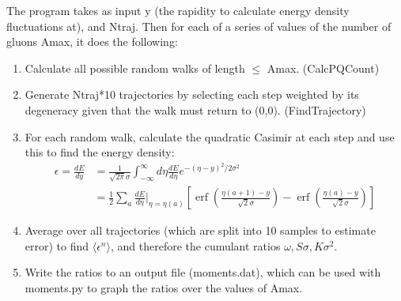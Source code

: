 \documentclass{article}
\DeclareMathOperator\erf{erf}
\begin{document}
The program takes as input y (the rapidity to calculate energy density fluctuations at), and Ntraj. Then for each of a series of values of the number of gluons Amax, it does the following:
\begin{enumerate}
  \item Calculate all possible random walks of length $\leq$ Amax. (CalcPQCount)
  \item Generate Ntraj*10 trajectories by selecting each step weighted by its degeneracy given that the walk must return to (0,0). (FindTrajectory)
  \item For each random walk, calculate the quadratic Casimir at each step and use this to find the energy density:
  \begin{align*}
  \epsilon = \frac{dE}{dy} &= \frac{1}{\sqrt{2 \pi} \sigma} \int_{-\infty}^{\infty} d\eta \frac{dE}{d\eta} e^{-(\eta-y)^2/2\sigma^2}  \\ 
  &= \frac{1}{2} \sum_a \frac{dE}{d\eta}\Bigr\rvert_{\eta=\eta(a)} \left[ \erf\left(\frac{\eta(a+1)-y}{\sqrt{2}\sigma}\right) - \erf\left(\frac{\eta(a)-y}{\sqrt{2}\sigma}\right)\right]
  \end{align*}
  \item Average over all trajectories (which are split into 10 samples to estimate error) to find $\langle\epsilon^n\rangle$, and therefore the cumulant ratios $\omega, S\sigma, K\sigma^2$.
  \item Write the ratios to an output file (moments.dat), which can be used with moments.py to graph the ratios over the values of Amax.
\end{enumerate}
\end{document}
